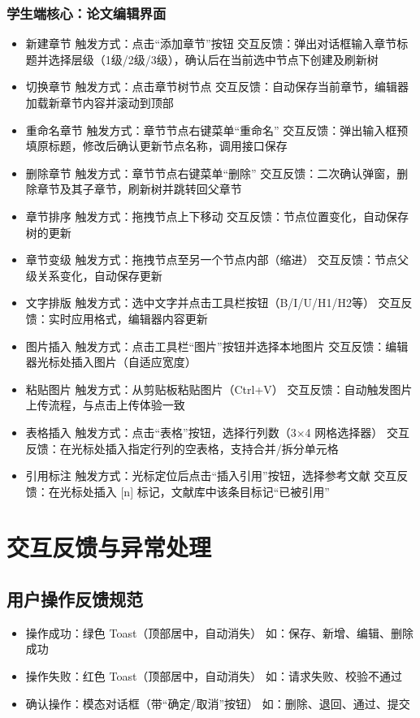 \documentclass{article}
\begin{document}
\subsubsection{学生端核心：论文编辑界面}
\begin{itemize}
	\item 新建章节 触发方式：点击“添加章节”按钮 交互反馈：弹出对话框输入章节标题并选择层级（1级/2级/3级），确认后在当前选中节点下创建及刷新树
	\item 切换章节 触发方式：点击章节树节点	交互反馈：自动保存当前章节，编辑器加载新章节内容并滚动到顶部
	\item 重命名章节 触发方式：章节节点右键菜单“重命名” 交互反馈：弹出输入框预填原标题，修改后确认更新节点名称，调用接口保存
	\item 删除章节 触发方式：章节节点右键菜单“删除” 交互反馈：二次确认弹窗，删除章节及其子章节，刷新树并跳转回父章节
	\item 章节排序 触发方式：拖拽节点上下移动 交互反馈：节点位置变化，自动保存树的更新
	\item 章节变级 触发方式：拖拽节点至另一个节点内部（缩进） 交互反馈：节点父级关系变化，自动保存更新
	\item 文字排版 触发方式：选中文字并点击工具栏按钮（B/I/U/H1/H2等）	交互反馈：实时应用格式，编辑器内容更新
	\item 图片插入 触发方式：点击工具栏“图片”按钮并选择本地图片	交互反馈：编辑器光标处插入图片（自适应宽度）
	\item 粘贴图片 触发方式：从剪贴板粘贴图片（Ctrl+V） 交互反馈：自动触发图片上传流程，与点击上传体验一致
	\item 表格插入 触发方式：点击“表格”按钮，选择行列数（3×4 网格选择器）	交互反馈：在光标处插入指定行列的空表格，支持合并/拆分单元格
	\item 引用标注 触发方式：光标定位后点击“插入引用”按钮，选择参考文献	交互反馈：在光标处插入 [n] 标记，文献库中该条目标记“已被引用”
\end{itemize}

\section{交互反馈与异常处理}
\subsection{用户操作反馈规范}
\begin{itemize}
	\item 操作成功：绿色 Toast（顶部居中，自动消失） 如：保存、新增、编辑、删除成功
	\item 操作失败：红色 Toast（顶部居中，自动消失） 如：请求失败、校验不通过
	\item 确认操作：模态对话框（带“确定/取消”按钮）  如：删除、退回、通过、提交
\end{itemize}
\end{document}
